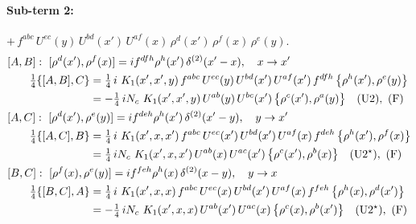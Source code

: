 \documentclass[10pt]{article}
\numberwithin{equation}{section}
\begin{document}
\paragraph{Sub-term 2:} $+\,f^{abc}\,U^{ec}(y)\,U^{bd}(x')\,U^{af}(x)\,\rho^{d}(x')\,\rho^{f}(x)\,\rho^{e}(y)$.
\begin{align}
&[A,B]:\ [\rho^{d}(x'),\rho^{f}(x)]=i f^{dfh}\rho^{h}(x')\,\delta^{(2)}(x'-x),\quad x\to x'\notag\\
&\qquad \tfrac14\{[A,B],C\}=\tfrac14\,i\,\,K_1(x',x',y)\,f^{abc}\,U^{ec}(y)\,U^{bd}(x')\,U^{af}(x')\,f^{dfh}\,\big\{\rho^{h}(x'),\rho^{e}(y)\big\}\notag\\
&\qquad\phantom{\tfrac14\{[A,B],C\}}=-\tfrac14\,i N_{c}\,\,K_1(x',x',y)\,U^{ab}(y)\,U^{bc}(x')\,\big\{\rho^{c}(x'),\rho^{a}(y)\big\}\quad\text{(U2)},\ \text{(F)}
\label{eq:B1-2-AB}\\
&[A,C]:\ [\rho^{d}(x'),\rho^{e}(y)]=i f^{deh}\rho^{h}(x')\,\delta^{(2)}(x'-y),\quad y\to x'\notag\\
&\qquad \tfrac14\{[A,C],B\}=\tfrac14\,i\,\,K_1(x',x,x')\,f^{abc}\,U^{ec}(x')\,U^{bd}(x')\,U^{af}(x)\,f^{deh}\,\big\{\rho^{h}(x'),\rho^{f}(x)\big\}\notag\\
&\qquad\phantom{\tfrac14\{[A,C],B\}}=\tfrac14\,i N_{c}\,\,K_1(x',x,x')\,U^{ab}(x)\,U^{ac}(x')\,\big\{\rho^{c}(x'),\rho^{b}(x)\big\}\quad\text{(U2$^\star$)},\ \text{(F)}
\label{eq:B1-2-AC}\\
&[B,C]:\ [\rho^{f}(x),\rho^{e}(y)]=i f^{feh}\rho^{h}(x)\,\delta^{(2)}(x-y),\quad y\to x\notag\\
&\qquad \tfrac14\{[B,C],A\}=\tfrac14\,i\,\,K_1(x',x,x)\,f^{abc}\,U^{ec}(x)\,U^{bd}(x')\,U^{af}(x)\,f^{feh}\,\big\{\rho^{h}(x),\rho^{d}(x')\big\}\notag\\
&\qquad\phantom{\tfrac14\{[B,C],A\}}=-\tfrac14\,i N_{c}\,\,K_1(x',x,x)\,U^{ab}(x')\,U^{ac}(x)\,\big\{\rho^{c}(x),\rho^{b}(x')\big\}\quad\text{(U2$^\star$)},\ \text{(F)}
\label{eq:B1-2-BC}
\end{align}
\end{document}
